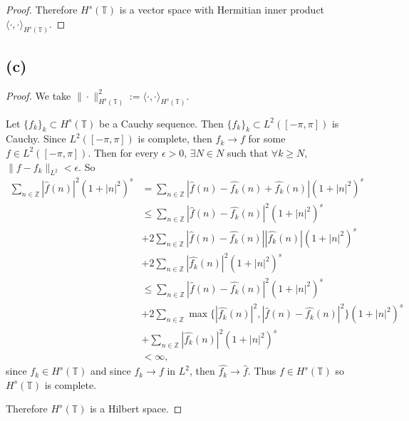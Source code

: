 \documentclass{article}
\begin{document}
\begin{proof}
	Therefore $H^s(\mathbb{T})$ is a vector space with Hermitian inner product $\langle \cdot, \cdot \rangle_{H^s(\mathbb{T})}$.
\end{proof}

\subsection*{(c)}
\begin{proof}
	We take $\|\cdot\|_{H^s(\mathbb{T})}^2 := \langle \cdot, \cdot \rangle_{H^s(\mathbb{T})}$.
	
	Let $\{f_k\}_k \subset H^s(\mathbb{T})$ be a Cauchy sequence. Then $\{f_k\}_k \subset L^2([-\pi, \pi])$ is Cauchy. Since $L^2([-\pi, \pi])$ is complete, then $f_k \to f$ for some $f \in L^2([-\pi, \pi])$. Then for every $\epsilon > 0$, $\exists N \in N$ such that $\forall k \geq N$, $\|f - f_k\|_{L^2} < \epsilon$. So
	\begin{align}
		\sum_{n \in \mathbb{Z}} \left|\hat{f}(n)\right|^2 \left(1 + |n|^2\right)^s &= \sum_{n \in \mathbb{Z}} \left|\hat{f}(n) - \hat{f_k}(n) + \hat{f_k}(n)\right| \left(1 + |n|^2\right)^s \\
		& \leq \sum_{n \in \mathbb{Z}} \left|\hat{f}(n) - \hat{f_k}(n)\right|^2 \left(1 + |n|^2\right)^s \\
		& + 2 \sum_{n \in \mathbb{Z}} \left|\hat{f}(n) - \hat{f_k}(n)\right|\left|\hat{f_k}(n)\right| \left(1 + |n|^2\right)^s \\
		& + 2 \sum_{n \in \mathbb{Z}} \left|\hat{f_k}(n)\right|^2 \left(1 + |n|^2\right)^s \\
		& \leq \sum_{n \in \mathbb{Z}} \left|\hat{f}(n) - \hat{f_k}(n)\right|^2 \left(1 + |n|^2\right)^s \\
		& + 2 \sum_{n \in \mathbb{Z}} \max\{\left|\hat{f_k}(n)\right|^2, \left|\hat{f}(n) - \hat{f_k}(n)\right|^2\} \left(1 + |n|^2\right)^s \\
		& + \sum_{n \in \mathbb{Z}} \left|\hat{f_k}(n)\right|^2 \left(1 + |n|^2\right)^s \\
		&< \infty,
	\end{align}
	since $f_k \in H^s(\mathbb{T})$ and since $f_k \to f$ in $L^2$, then $\hat{f_k} \to \hat{f}$.
	Thus $f \in H^s(\mathbb{T})$ so $H^s(\mathbb{T})$ is complete. 
	
	Therefore $H^s(\mathbb{T})$ is a Hilbert space.
\end{proof}
\end{document}
